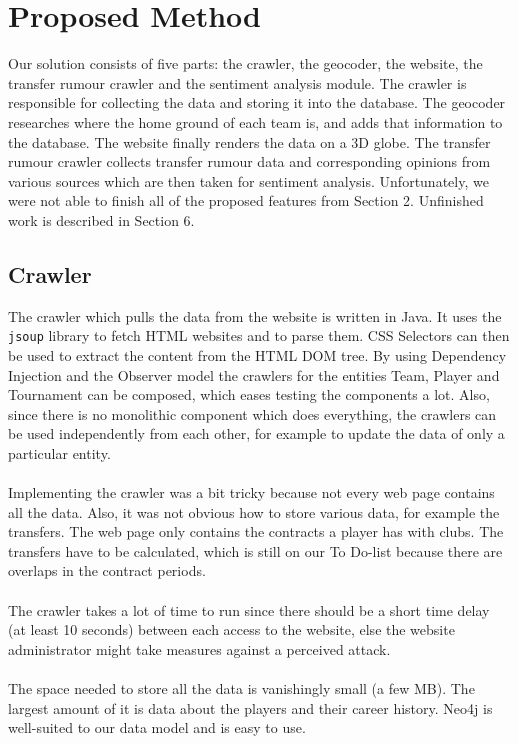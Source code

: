 \documentclass{article}
\begin{document}
\section{Proposed Method}
Our solution consists of five parts: the crawler, the geocoder, the website, the transfer rumour crawler and the sentiment analysis module. The crawler is responsible for collecting the data and storing it into the database. The geocoder researches where the home ground of each team is, and adds that information to the database. The website finally renders the data on a 3D globe. The transfer rumour crawler collects transfer rumour data and corresponding opinions from various sources which are then taken for sentiment analysis. Unfortunately, we were not able to finish all of the proposed features from Section 2. Unfinished work is described in Section 6.  

\subsection{Crawler}

The crawler which pulls the data from the website is written in Java. It uses the \verb+jsoup+ library \cite{jsoup} to fetch HTML websites and to parse them. CSS Selectors can then be used to extract the content from the HTML DOM tree. By using Dependency Injection and the Observer model the crawlers for the entities Team, Player and Tournament can be composed, which eases testing the components a lot. Also, since there is no monolithic component which does everything, the crawlers can be used independently from each other, for example to update the data of only a particular entity. 
\\ \\
Implementing the crawler was a bit tricky because not every web page contains all the data. Also, it was not obvious how to store various data, for example the transfers. The web page only contains the contracts a player has with clubs. The transfers have to be calculated, which is  still on our To Do-list because there are overlaps in the contract periods. 
\\ \\
The crawler takes a lot of time to run since there should be a short time delay (at least 10 seconds) between each access to the website, else the website administrator might take measures against a perceived attack.
\\ \\
The space needed to store all the data is vanishingly small (a few MB). The largest amount of it is data about the players and their career history. Neo4j is well-suited to our data model and is easy to use. 
\end{document}
